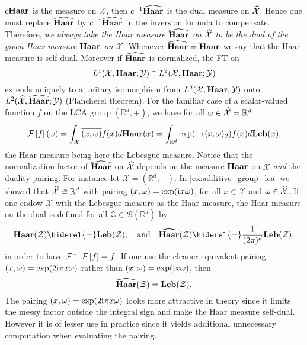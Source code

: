 $c\mathbf{Haar}$ is the measure on $\mathcal{X}$, then $c^{-1}\widehat{\mathbf{Haar}}$ is the dual
measure on $\widehat{\mathcal{X}}$. Hence one must replace $\widehat{\mathbf{Haar}}$ by
$c^{-1}\widehat{\mathbf{Haar}}$ in the inversion formula to compensate. Therefore,
\emph{we always take the Haar measure $\widehat{\mathbf{Haar}}$ on $\widehat{\mathcal{X}}$ to
be the dual of the given Haar measure $\mathbf{Haar}$ on $\mathcal{X}$}. Whenever
$\widehat{\mathbf{Haar}}=\mathbf{Haar}$ we say that the Haar measure is self-dual. Moreover if
$\widehat{\mathbf{Haar}}$ is normalized, the \acl{FT} on
\begin{dmath*}
    L^1(\mathcal{X},\Haar;\mathcal{Y})\cap L^2(\mathcal{X},\Haar;\mathcal{Y})
\end{dmath*}
extends uniquely to a unitary isomorphism from $L^2(\mathcal{X}, \mathbf{Haar},
\mathcal{Y})$ onto $L^2(\widehat{\mathcal{X}}, \widehat{\mathbf{Haar}}; \mathcal{Y})$
(Plancherel theorem). For the familiar case of a scalar-valued function $f$ on
the \ac{LCA} group $(\mathbb{R}^d, +)$, we have for all $\omega\in
\widehat{\mathcal{X}}=\mathbb{R}^d$
\begin{dmath}
    \label{fourier-R-plus}
    \FT{f}(\omega)
    =\int_{\mathcal{X}} \conj{\pairing{x,\omega}}f(x)d\Haar(x)
    =\int_{\mathbb{R}^d} \exp(-\iu \inner{x,\omega}_2)f(x) d\Leb(x),
\end{dmath}
the Haar measure being here the Lebesgue measure. Notice that the normalization
factor of $\widehat{\mathbf{Haar}}$ on $\widehat{\mathcal{X}}$ depends on the measure $\mathbf{Haar}$
on $\mathcal{X}$ \emph{and} the duality pairing. For instance let
$\mathcal{X}=(\mathbb{R}^d, +)$. In \cref{ex:additive_group_lca} we showed that
$\widehat{\mathcal{X}}\cong\mathbb{R}^d$ with pairing $(x,\omega)=\exp({\mathrm{i}\mkern1mu}
x\omega)$, for all $x\in\mathcal{X}$ and $\omega\in\widehat{\mathcal{X}}$.
If one endow $\mathcal{X}$ with the Lebesgue measure as the Haar measure, the
Haar measure on the dual is defined for all
$\mathcal{Z}\in\mathcal{B}(\mathbb{R}^d)$ by
\begin{dmath*}
    \Haar(\mathcal{Z})\hiderel{=}\Leb(\mathcal{Z}),
    \quad\text{and}\quad
    \dual{\Haar}(\mathcal{Z})\hiderel{=}\frac{1}{(2\pi)^d}\Leb(\mathcal{Z}),
\end{dmath*}
in order to have $\mathcal{F}^{-1}\mathcal{F}\left[f\right]=f$. If one use the cleaner equivalent
pairing $(x,\omega)=\exp(2{\mathrm{i}\mkern1mu}\pi x\omega)$ rather than
$(x,\omega)=\exp({\mathrm{i}\mkern1mu} x\omega)$, then
\begin{dmath*}
    \dual{\Haar}(\mathcal{Z})=\Leb(\mathcal{Z}).
\end{dmath*}
The pairing $(x,\omega)=\exp(2{\mathrm{i}\mkern1mu}\pi x\omega)$ looks more attractive in
theory since it limits the messy factor outside the integral sign and make the
Haar measure self-dual. However it is of lesser use in practice since it yields
additional unnecessary computation when evaluating the pairing.

